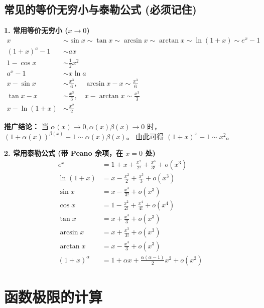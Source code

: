 \documentclass[a4paper,12pt]{ctexart} %
\newenvironment{rednote}
  {\begin{tcolorbox}[colback=notepurple, colframe=highlightred, boxrule=1pt, title=\textbf{手写笔记补充}]}
  {\end{tcolorbox}}
\begin{document}
\subsection{常见的等价无穷小与泰勒公式 (必须记住)}

\textbf{1. 常用等价无穷小 ($x \to 0$)}
\begin{align*}
    x &\sim \sin x \sim \tan x \sim \arcsin x \sim \arctan x \sim \ln(1+x) \sim e^x - 1 \\
    (1+x)^a - 1 &\sim ax \\
    1 - \cos x &\sim \frac{1}{2}x^2 \\
    a^x - 1 &\sim x \ln a \\
    x - \sin x &\sim \frac{x^3}{6}, \quad \arcsin x - x \sim \frac{x^3}{6} \\
    \tan x - x &\sim \frac{x^3}{3}, \quad x - \arctan x \sim \frac{x^3}{3} \\
    x - \ln(1+x) &\sim \frac{x^2}{2}
\end{align*}

\begin{rednote}
    \textbf{推广结论：}
    当 $\alpha(x) \to 0, \alpha(x)\beta(x) \to 0$ 时，$(1+\alpha(x))^{\beta(x)} - 1 \sim \alpha(x)\beta(x)$。
    由此可得 $(1+x)^x - 1 \sim x^2$。
\end{rednote}

\textbf{2. 常用泰勒公式 (带 Peano 余项，在 $x=0$ 处)}
\begin{align*}
    e^x &= 1 + x + \frac{x^2}{2!} + \frac{x^3}{3!} + o(x^3) \\
    \ln(1+x) &= x - \frac{x^2}{2} + \frac{x^3}{3} + o(x^3) \\
    \sin x &= x - \frac{x^3}{3!} + o(x^3) \\
    \cos x &= 1 - \frac{x^2}{2!} + \frac{x^4}{4!} + o(x^4) \\
    \tan x &= x + \frac{x^3}{3} + o(x^3) \\
    \arcsin x &= x + \frac{x^3}{3!} + o(x^3) \\
    \arctan x &= x - \frac{x^3}{3} + o(x^3) \\
    (1+x)^\alpha &= 1 + \alpha x + \frac{\alpha(\alpha-1)}{2}x^2 + o(x^2)
\end{align*}

\section{函数极限的计算}
\end{document}
